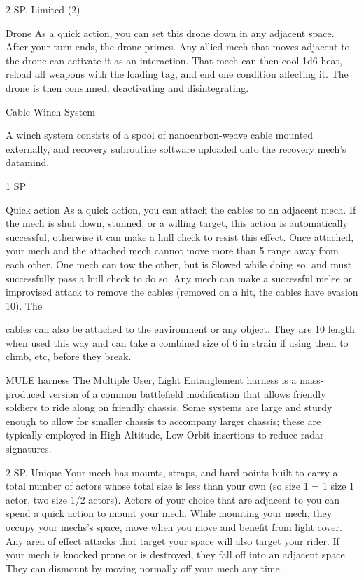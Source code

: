 2 SP, Limited (2)  

Drone  
As a quick action, you can set this drone down in any adjacent space. After your turn ends, the  
drone primes. Any allied mech that moves adjacent to the drone can activate it as an interaction.  
That mech can then cool 1d6 heat, reload all weapons with the loading tag, and end one  
condition affecting it. The drone is then consumed, deactivating and disintegrating.
 

Cable Winch System   

A winch system consists of a spool of nanocarbon-weave cable mounted externally, and recovery  
subroutine software uploaded onto the recovery mech’s datamind.   

1 SP  

Quick action  
As a quick action, you can attach the cables to an adjacent mech. If the mech is shut down,  
stunned, or a willing target, this action is automatically successful, otherwise it can make a hull  
check to resist this effect. Once attached, your mech and the attached mech cannot move more  
than 5 range away from each other. One mech can tow the other, but is Slowed while doing so,  
and must successfully pass a hull check to do so. Any mech can make a successful melee or  
improvised attack to remove the cables (removed on a hit, the cables have evasion 10). The  

                                                                                                                      


cables can also be attached to the environment or any object. They are 10 length when used this  
way and can take a combined size of 6 in strain if using them to climb, etc, before they break.
 

MULE harness  
The Multiple User, Light Entanglement harness is a mass-produced version of a common battlefield  
modification that allows friendly soldiers to ride along on friendly chassis. Some systems are large and  
sturdy enough to allow for smaller chassis to accompany larger chassis; these are typically employed in  
High Altitude, Low Orbit insertions to reduce radar signatures.  

2 SP, Unique  
Your mech has mounts, straps, and hard points built to carry a total number of actors whose   
total size is less than your own (so size 1 = 1 size 1 actor, two size 1/2 actors). Actors of your  
choice that are adjacent to you can spend a quick action to mount your mech. While mounting  
your mech, they occupy your mechs’s space, move when you move and benefit from light cover.  
Any area of effect attacks that target your space will also target your rider. If your mech is  
knocked prone or is destroyed, they fall off into an adjacent space. They can dismount by  
moving normally off your mech any time.  

